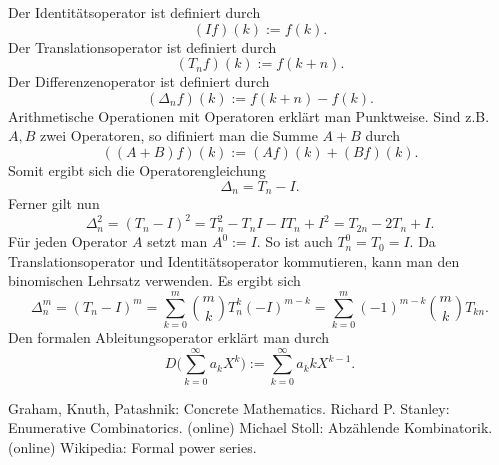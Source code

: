\documentclass[a4paper,12pt,fleqn]{article}
\begin{document}
Der Identitätsoperator ist definiert durch
\begin{equation}
(If)(k) := f(k).
\end{equation}
Der Translationsoperator ist definiert durch
\begin{equation}
(T_n f)(k) := f(k+n).
\end{equation}
Der Differenzenoperator ist definiert durch
\begin{equation}
(\Delta_n f)(k) := f(k+n)-f(k).
\end{equation}
Arithmetische Operationen mit Operatoren erklärt man Punktweise.
Sind z.B. $A,B$ zwei Operatoren, so difiniert man die Summe $A+B$
durch
\begin{equation}
((A+B)f)(k):=(A f)(k)+(B f)(k).
\end{equation}
Somit ergibt sich die Operatorengleichung
\begin{equation}
\Delta_n = T_n-I.
\end{equation}
Ferner gilt nun
\begin{equation}
\Delta_n^2 = (T_n-I)^2
= T_n^2-T_nI-IT_n+I^2
= T_{2n}-2T_n+I.
\end{equation}
Für jeden Operator $A$ setzt man $A^0:=I$. So ist auch $T_n^0=T_0=I$.
Da Translationsoperator und Identitätsoperator kommutieren, kann
man den binomischen Lehrsatz verwenden. Es ergibt sich
\[\Delta_n^m = (T_n-I)^m
= \sum_{k=0}^m \binom{m}{k} T_n^k (-I)^{m-k}
= \sum_{k=0}^m (-1)^{m-k}\binom{m}{k} T_{kn}.\]
Den formalen Ableitungsoperator erklärt man durch
\begin{equation}
D\Big(\sum_{k=0}^\infty a_kX^k\Big)
:= \sum_{k=0}^\infty a_k kX^{k-1}.
\end{equation}


\begin{thebibliography}{10}
\setlength{\itemsep}{0pt}
 Graham, Knuth, Patashnik: Concrete Mathematics.
 Richard P. Stanley: Enumerative Combinatorics. (online)
 Michael Stoll: Abzählende Kombinatorik. (online)
 Wikipedia: Formal power series.
\end{thebibliography}
\end{document}
